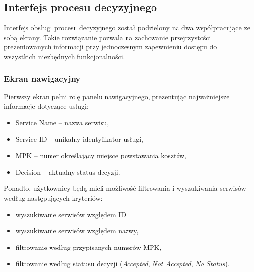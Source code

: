 \subsection{Interfejs procesu decyzyjnego}
Interfejs obsługi procesu decyzyjnego został podzielony na dwa współpracujące ze sobą ekrany. Takie rozwiązanie pozwala na zachowanie przejrzystości prezentowanych informacji przy jednoczesnym zapewnieniu dostępu do wszystkich niezbędnych funkcjonalności.

\subsubsection*{Ekran nawigacyjny}
Pierwszy ekran pełni rolę panelu nawigacyjnego, prezentując najważniejsze informacje dotyczące usługi:
\begin{itemize}
    \item Service Name -- nazwa serwisu,
    \item Service ID -- unikalny identyfikator usługi,
    \item MPK -- numer określający miejsce powstawania kosztów,
    \item Decision -- aktualny status decyzji.
\end{itemize}
Ponadto, użytkownicy będą mieli możliwość filtrowania i wyszukiwania serwisów według następujących kryteriów:
\begin{itemize}
    \item wyszukiwanie serwisów względem ID,
    \item wyszukiwanie serwisów względem nazwy,
    \item filtrowanie według przypisanych numerów MPK,
    \item filtrowanie według statusu decyzji (\emph{Accepted}, \emph{Not Accepted}, \emph{No Status}).
\end{itemize}

